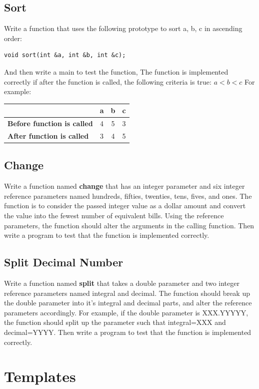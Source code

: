 \documentclass{article}
\begin{document}
\subsection{Sort}
Write a function that uses the following prototype to sort a, b, c in ascending order:
\begin{verbatim}
void sort(int &a, int &b, int &c);
\end{verbatim}
And then write a main to test the function, The function is implemented correctly if after the function is called, the following criteria is true: $a<b<c$ For example:

\begin{tabular}{|l|c|c|c|}
\hline
& \textbf{a} & \textbf{b} & \textbf{c}\\
\hline
\textbf{Before function is called} & 4 & 5 & 3\\
\hline
\textbf{After function is called} & 3 & 4 & 5\\
\hline
\end{tabular}

\subsection{Change}
Write a function named \textbf{change} that has an integer parameter and six integer reference parameters named hundreds, fifties, twenties, tens, fives, and ones. The function is to consider the passed integer value as a dollar amount and convert the value into the fewest number of equivalent bills. Using the reference parameters, the function should alter the arguments in the calling function. Then write a program to test that the function is implemented correctly.  

\subsection{Split Decimal Number}
Write a function named \textbf{split} that takes a double parameter and two integer reference parameters named integral and decimal. The function should break up the double parameter into it's integral and decimal parts, and alter the reference parameters accordingly. For example, if the double  parameter is XXX.YYYYY, the function should split up the parameter such that integral=XXX and decimal=YYYY. Then write a program to test that the function is implemented correctly. 

\section{Templates}
\end{document}
